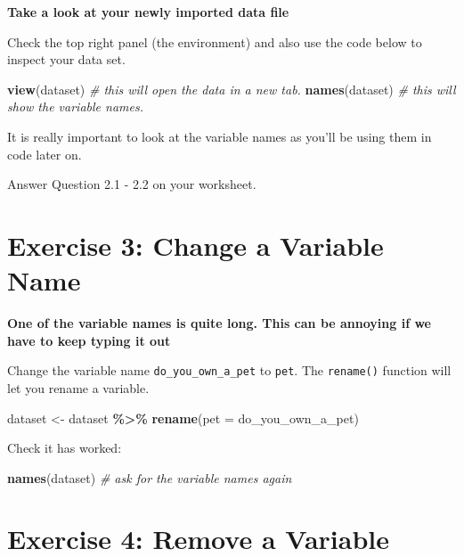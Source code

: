 \documentclass[
]{book}
\newenvironment{Shaded}{\begin{snugshade}}{\end{snugshade}}
\newcommand{\AttributeTok}[1]{\textcolor[rgb]{0.13,0.29,0.53}{#1}}
\newcommand{\CommentTok}[1]{\textcolor[rgb]{0.56,0.35,0.01}{\textit{#1}}}
\newcommand{\FunctionTok}[1]{\textcolor[rgb]{0.13,0.29,0.53}{\textbf{#1}}}
\newcommand{\NormalTok}[1]{#1}
\newcommand{\OtherTok}[1]{\textcolor[rgb]{0.56,0.35,0.01}{#1}}
\newcommand{\SpecialCharTok}[1]{\textcolor[rgb]{0.81,0.36,0.00}{\textbf{#1}}}
\let\oldsection\section
\renewcommand{\section}{\needspace{5\baselineskip}\oldsection}
\begin{document}
\textbf{Take a look at your newly imported data file}

Check the top right panel (the environment) and also use the code below to inspect your data set.

\begin{Shaded}
\begin{Highlighting}[]
\FunctionTok{view}\NormalTok{(dataset) }\CommentTok{\# this will open the data in a new tab.}
\FunctionTok{names}\NormalTok{(dataset) }\CommentTok{\# this will show the variable names.}
\end{Highlighting}
\end{Shaded}

It is really important to look at the variable names as you'll be using them in code later on.

Answer Question 2.1 - 2.2 on your worksheet.

\section{Exercise 3: Change a Variable Name}\label{exercise-3-change-a-variable-name}

\textbf{One of the variable names is quite long. This can be annoying if we have to keep typing it out}

Change the variable name \texttt{do\_you\_own\_a\_pet} to \texttt{pet}. The \texttt{rename()} function will let you rename a variable.

\begin{Shaded}
\begin{Highlighting}[]
\NormalTok{dataset }\OtherTok{\textless{}{-}}\NormalTok{ dataset }\SpecialCharTok{\%\textgreater{}\%}
  \FunctionTok{rename}\NormalTok{(}\AttributeTok{pet =}\NormalTok{ do\_you\_own\_a\_pet)}
\end{Highlighting}
\end{Shaded}

Check it has worked:

\begin{Shaded}
\begin{Highlighting}[]
\FunctionTok{names}\NormalTok{(dataset) }\CommentTok{\# ask for the variable names again}
\end{Highlighting}
\end{Shaded}

\section{Exercise 4: Remove a Variable}\label{exercise-4-remove-a-variable}
\end{document}
